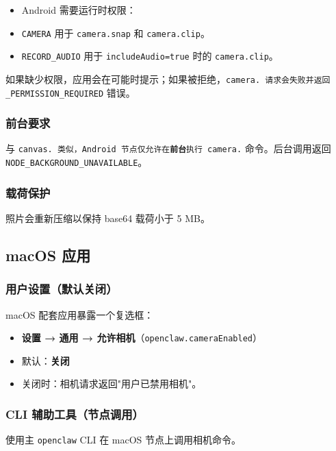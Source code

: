 \begin{itemize}
  \item Android 需要运行时权限：
  \item \texttt{CAMERA} 用于 \texttt{camera.snap} 和 \texttt{camera.clip}。
  \item \texttt{RECORD\_AUDIO} 用于 \texttt{includeAudio=true} 时的 \texttt{camera.clip}。
\end{itemize}


如果缺少权限，应用会在可能时提示；如果被拒绝，\texttt{camera.\textit{} 请求会失败并返回 \texttt{}\_PERMISSION\_REQUIRED} 错误。

\subsubsection{前台要求}


与 \texttt{canvas.\textit{} 类似，Android 节点仅允许在\textbf{前台}执行 \texttt{camera.}} 命令。后台调用返回 \texttt{NODE\_BACKGROUND\_UNAVAILABLE}。

\subsubsection{载荷保护}


照片会重新压缩以保持 base64 载荷小于 5 MB。

\subsection{macOS 应用}


\subsubsection{用户设置（默认关闭）}


macOS 配套应用暴露一个复选框：

\begin{itemize}
  \item \textbf{设置 → 通用 → 允许相机}（\texttt{openclaw.cameraEnabled}）
  \item 默认：\textbf{关闭}
  \item 关闭时：相机请求返回"用户已禁用相机"。
\end{itemize}


\subsubsection{CLI 辅助工具（节点调用）}


使用主 \texttt{openclaw} CLI 在 macOS 节点上调用相机命令。

